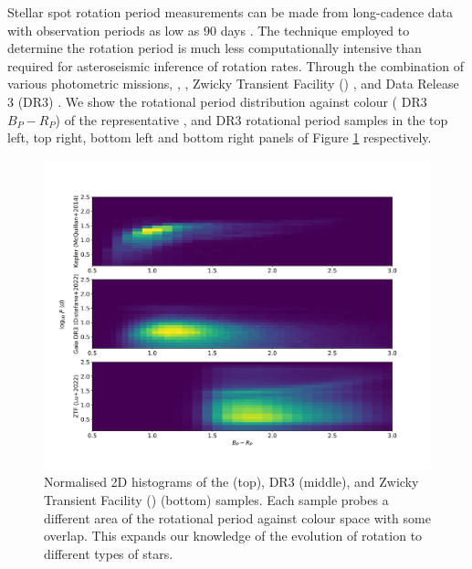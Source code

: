 Stellar spot rotation period measurements can be made from long-cadence data with observation periods as low as 90 days \citep{mcquillan_rotation_2014}.
The technique employed to determine the rotation period is much less computationally intensive than required for asteroseismic inference of rotation rates.
Through the combination of various photometric missions, \kepler{} \citep{mcquillan_rotation_2014, santos_surface_2021}, \ktoo{} \citep{santos_surface_2021}, Zwicky Transient Facility (\ZTF) \citep{lu_bridging_2022}, and \gaia{} Data Release 3 (DR3) \citep{distefano_gaia_2022}. %
We show the rotational period distribution against colour (\gaia{} DR3 $B_P - R_P$) of the representative \kepler{}, \ZTF{} and \gaia{} DR3 rotational period samples in the top left, top right, bottom left and bottom right panels of Figure \ref{fig:rot_comp} respectively.

\begin{figure}[h]
    \includegraphics[width=\textwidth]{Figures/intro_figures/rot_comp.png}
    \caption[2D normalised histograms of representative \kepler, \gaia, and \ZTF{} rotational period distributions]{Normalised 2D histograms of the \kepler{} \citep{mcquillan_rotation_2014} (top), \gaia{} DR3 \citep{distefano_gaia_2022} (middle), and Zwicky Transient Facility (\ZTF) \citep{lu_bridging_2022} (bottom) samples. Each sample probes a different area of the rotational period against colour space with some overlap. This expands our knowledge of the evolution of rotation to different types of stars. }
    \label{fig:rot_comp}
\end{figure}

